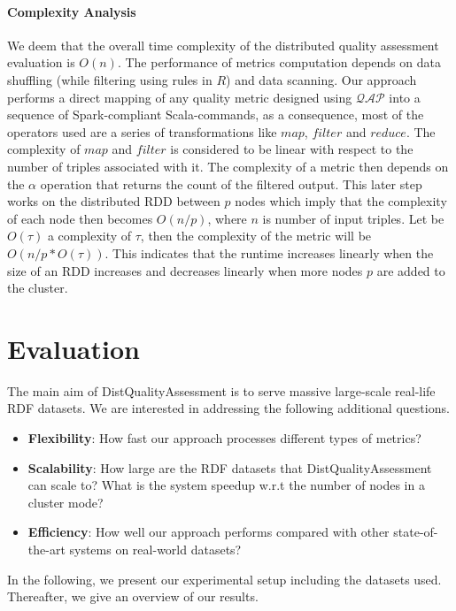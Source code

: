 \paragraph{\textbf{Complexity Analysis}}
We deem that the overall time complexity of the distributed quality assessment evaluation is $O(n)$.
The performance of metrics computation depends on data shuffling (while filtering using rules in $R$) and data scanning. 
Our approach performs a direct mapping of any quality metric designed using $\mathcal{QAP}$ into a sequence of Spark-compliant Scala-commands, as a consequence, most of the operators used are a series of transformations like $map$, $filter$ and $reduce$.
The complexity of $map$ and $filter$ is considered to be linear with respect to the number of triples associated with it. 
The complexity of a metric then depends on the $\alpha$ operation that returns the count of the filtered output.
This later step works on the distributed \gls{RDD} between $p$ nodes which imply that the complexity of each node then becomes $O(n/p)$, where $n$ is number of input triples.
Let be $O(\tau)$ a complexity of $\tau$, then the complexity of the metric will be $O(n/p*O(\tau))$.
This indicates that the runtime increases linearly when the size of an \gls{RDD} increases and decreases linearly when more nodes $p$ are added to the cluster.


\section{Evaluation}
\label{sec:distqualityassessment-evaluation}

The main aim of DistQualityAssessment is to serve massive large-scale real-life \gls{RDF} datasets. 
We are interested in addressing the following additional questions.

\begin{itemize}
    \item \textbf{Flexibility}: How fast our approach processes different types of metrics?
    \item \textbf{Scalability}: How large are the \gls{RDF} datasets that DistQualityAssessment can scale to? 
    What is the system speedup w.r.t the number of nodes in a cluster mode?
    \item \textbf{Efficiency}: How well our approach performs compared with other state-of-the-art systems on real-world datasets?
\end{itemize}
In the following, we present our experimental setup including the datasets used. 
Thereafter, we give an overview of our results.

